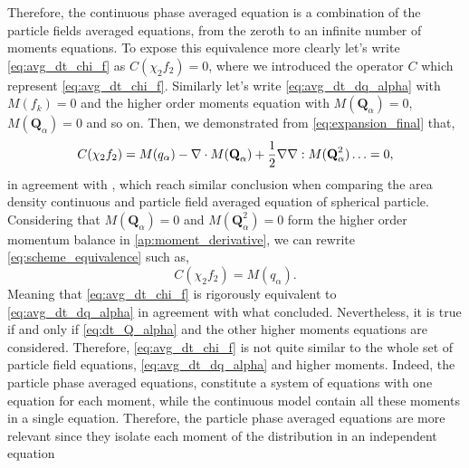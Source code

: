 Therefore, the continuous phase averaged equation is a combination of the particle fields averaged equations, from the zeroth to an infinite number of moments equations. 
To expose this equivalence more clearly let's write \ref{eq:avg_dt_chi_f} as $C(\chi_2f_2) = 0$, where we introduced the operator $C$ which represent  \ref{eq:avg_dt_chi_f}.
Similarly let's write \ref{eq:avg_dt_dq_alpha} with $M(f_k) = 0$ and the higher order moments equation with  $M(\textbf{Q}_\alpha) =0$, $M(\textbf{Q}_\alpha) =0$ and so on. 
Then, we demonstrated from \ref{eq:expansion_final} that, 
\begin{equation}
    C(\chi_2 f_2) = M(q_\alpha) - \mathbf{\nabla} \cdot M(\textbf{Q}_\alpha) + \frac{1}{2} \mathbf{\nabla}\mathbf{\nabla} : M(\textbf{Q}^2_\alpha) \ldots = 0,
    \label{eq:scheme_equivalence}
\end{equation} 
in agreement with \cite{lhuillier2000bilan}, which reach similar conclusion when comparing the area density continuous and particle field averaged equation of spherical particle. 
Considering that $M(\textbf{Q}_\alpha) =0$ and $M(\textbf{Q}^2_\alpha) =0$ form the higher order momentum balance in \ref{ap:moment_derivative}, we can rewrite \ref{eq:scheme_equivalence} such as, 
\begin{equation}
    C(\chi_2 f_2) = M(q_\alpha).
\end{equation}
Meaning that \ref{eq:avg_dt_chi_f} is rigorously equivalent to \ref{eq:avg_dt_dq_alpha} in agreement with what \cite{nott2011suspension} concluded.
Nevertheless, it is true if and only if \ref{eq:dt_Q_alpha} and the other higher moments equations are considered.
Therefore, \ref{eq:avg_dt_chi_f} is not quite similar to the whole set of particle field equations, \ref{eq:avg_dt_dq_alpha} and higher moments.
Indeed, the particle phase averaged equations, constitute a system of equations with one equation for each moment, while the continuous model contain all these moments in a single equation. 
Therefore, the particle phase averaged equations are more relevant since they isolate each moment of the distribution in an independent equation 




